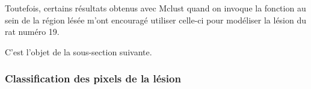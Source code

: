 \etoile
Toutefois, certains r\'esultats obtenus avec Mclust quand on invoque la fonction au sein de la r\'egion l\'es\'ee %
m'ont encourag\'e  utiliser celle-ci pour mod\'eliser la l\'esion du rat num\'ero 19.

\par
C'est l'objet de la sous-section suivante.

\FloatBarrier
\subsubsection{Classification des pixels de la l\'esion}



